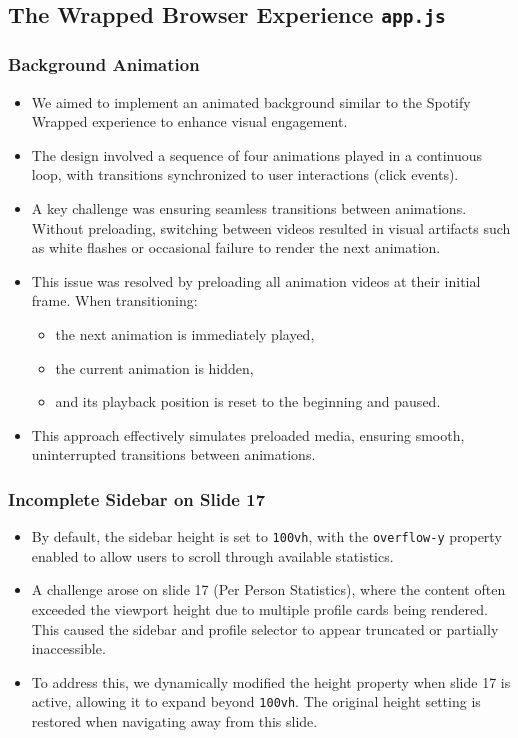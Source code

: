 \documentclass[11pt,a4paper]{article}
\begin{document}
\subsection{The Wrapped Browser Experience \texttt{app.js}}
\subsubsection{Background Animation}
\begin{itemize}
    \item We aimed to implement an animated background similar to the Spotify Wrapped experience to enhance visual engagement.
    
    \item The design involved a sequence of four animations played in a continuous loop, with transitions synchronized to user interactions (click events).
    
    \item A key challenge was ensuring seamless transitions between animations. Without preloading, switching between videos resulted in visual artifacts such as white flashes or occasional failure to render the next animation.
    
    \item This issue was resolved by preloading all animation videos at their initial frame. When transitioning:
    \begin{itemize}
        \item the next animation is immediately played,
        \item the current animation is hidden,
        \item and its playback position is reset to the beginning and paused.
    \end{itemize}
    
    \item This approach effectively simulates preloaded media, ensuring smooth, uninterrupted transitions between animations.
\end{itemize}

\subsubsection{Incomplete Sidebar on Slide 17}
\begin{itemize}
    \item By default, the sidebar height is set to \texttt{100vh}, with the \texttt{overflow-y} property enabled to allow users to scroll through available statistics.
    
    \item A challenge arose on slide 17 (Per Person Statistics), where the content often exceeded the viewport height due to multiple profile cards being rendered. This caused the sidebar and profile selector to appear truncated or partially inaccessible.
    
    \item To address this, we dynamically modified the height property when slide 17 is active, allowing it to expand beyond \texttt{100vh}. The original height setting is restored when navigating away from this slide.
\end{itemize}
\end{document}

